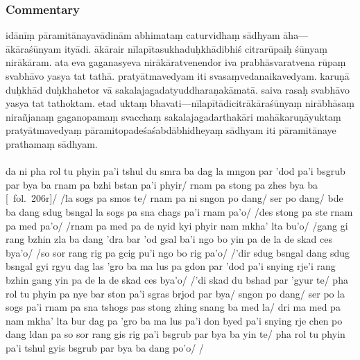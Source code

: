 \documentclass[12pt]{article}
\newcommand{\emdash} {\hspace{0em}—\hspace{0em}}
\begin{document}
\subsubsection{Commentary}
idānīṃ pāramitānayavādinām abhimataṃ\footnoteB{
	abhimataṃ] \EDD; abhimata \MS
} caturvidhaṃ sādhyam āha\emdash ākāraśūnyam ityādi.
ākārair nīlapītasukhaduḥkhādibhiś citrarūpaiḥ śūnyaṃ nirākāram.
ata eva gaganasyeva nirākāratvenendor iva prabhāsvaratvena rūpaṃ svabhāvo yasya tat tathā.
pratyātmavedyam iti svasaṃvedanaikavedyam.\footnoteB{
	svasaṃvedanaikavedyam] \EDD\ (\emd) (°vedyaṃ); svasaṃvedyanaikavedyaṃ \MS
}
karuṇā duḥkhād\footnoteB{
	karuṇā duḥkhād] \MS; karuṇāduḥkhā° \EDD
} duḥkhahetor vā sakalajagadatyuddharaṇakāmatā.
saiva rasaḥ svabhāvo yasya tat tathoktam.
etad uktaṃ bhavati\emdash nīlapītādicitrākāraśūnyaṃ nirābhāsaṃ\footnoteB{
	nirābhāsaṃ] \emd ; nirābhāsa \MS\ \EDD
} nirañjanaṃ gaganopamaṃ svacchaṃ sakalajagadarthakāri mahākaruṇāyuktaṃ pratyātmavedyaṃ pāramitopadeśaśabdābhidheyaṃ sādhyam iti pāramitānaye prathamaṃ sādhyam.\\

\textbf{\TVA}\\
da ni pha rol tu phyin pa'i tshul du smra ba dag la mngon par 'dod pa'i bsgrub par bya ba rnam pa bzhi bstan pa'i phyir/ rnam pa stong pa zhes bya ba [\TVA\ fol.\ 206r]/ /la sogs pa smos te/ rnam pa ni sngon po dang/ ser po dang/ bde ba dang sdug bsngal la sogs pa sna chags pa'i rnam pa'o/ /des stong pa ste rnam pa med pa'o/ /rnam pa med pa de nyid kyi phyir nam mkha' lta bu'o/ /gang gi rang bzhin zla ba dang 'dra bar 'od gsal ba'i ngo bo yin pa de la de skad ces bya'o/ /so sor rang rig pa gcig pu'i ngo bo rig pa'o/ /'dir sdug bsngal dang sdug bsngal gyi rgyu dag las 'gro ba ma lus pa gdon par 'dod pa'i snying rje'i rang bzhin gang yin pa de la de skad ces bya'o/ /'di skad du bshad par 'gyur te/ pha rol tu phyin pa nye bar ston pa'i sgras brjod par bya/ sngon po dang/ ser po la sogs pa'i rnam pa sna tshogs pas stong zhing snang ba med la/ dri ma med pa nam mkha' lta bur dag pa 'gro ba ma lus pa'i don byed pa'i snying rje chen po dang ldan pa so sor rang gis rig pa'i bsgrub par bya ba yin te/ pha rol tu phyin pa'i tshul gyis bsgrub par bya ba dang po'o/ /\\
\end{document}
